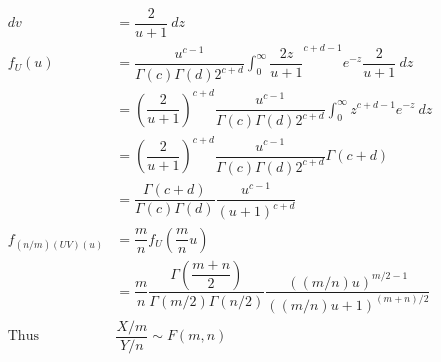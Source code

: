 \documentclass{article}
\begin{document}
\begin{flushleft}
\begin{align*}
dv&=\dfrac{2}{u+1} \ dz\\
f_U(u)&=\dfrac{u^{c-1}}{\Gamma(c)\Gamma(d)2^{c+d}}\int_{0}^{\infty}\dfrac{2z}{u+1}^{c+d-1}e^{-z} \dfrac{2}{u+1} \ dz\\
&=\left(\dfrac{2}{u+1}\right)^{c+d}\dfrac{u^{c-1}}{\Gamma(c)\Gamma(d)2^{c+d}}\int_{0}^{\infty}z^{c+d-1}e^{-z} \ dz\\
&=\left(\dfrac{2}{u+1}\right)^{c+d}\dfrac{u^{c-1}}{\Gamma(c)\Gamma(d)2^{c+d}}\Gamma(c+d)\\
&=\dfrac{\Gamma(c+d)}{\Gamma(c)\Gamma(d)}\dfrac{u^{c-1}}{(u+1)^{c+d}}\\
f_{(n/m)(UV)(u)}&=\dfrac{m}{n}f_U(\dfrac{m}{n}u)\\
&=\dfrac{m}{n}\dfrac{\Gamma(\dfrac{m+n}{2})}{\Gamma(m/2)\Gamma(n/2)}\dfrac{((m/n)u)^{m/2-1}}{((m/n)u+1)^{(m+n)/2}}\\
\text{Thus } &\dfrac{X/m}{Y/n} \sim F(m,n)
\end{align*}

\end{flushleft}
\end{document}
